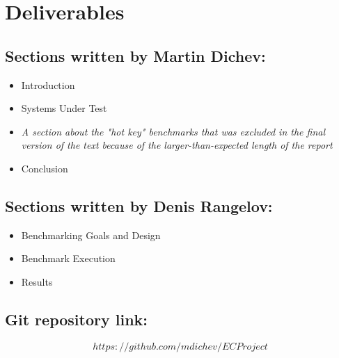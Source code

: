 \documentclass[letterpaper, 10 pt, conference]{ieeeconf}  %
\begin{document}
\section{Deliverables}

\subsection{Sections written by Martin Dichev:}
\begin{itemize}
    \item Introduction
    \item Systems Under Test
    \item \textit{A section about the "hot key" benchmarks that was excluded in the final version of the text because of the larger-than-expected length of the report}
    \item Conclusion
\end{itemize}
\subsection{Sections written by Denis Rangelov:}
\begin{itemize}
    \item Benchmarking Goals and Design
    \item Benchmark Execution
    \item Results
\end{itemize}
\subsection{Git repository link:}
$$ https://github.com/mdichev/ECProject $$
\addtolength{\textheight}{-12cm}   %

\printbibliography
  
\end{document}
